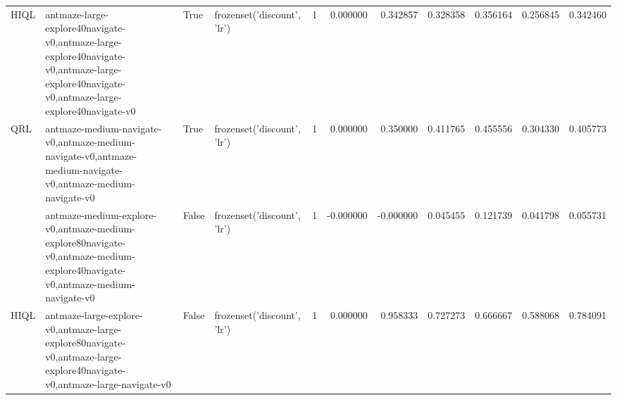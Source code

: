 \begin{tabular}{llllrrrrrrr}
\cline{1-11} \cline{2-11} \cline{3-11}
HIQL & antmaze-large-explore40navigate-v0,antmaze-large-explore40navigate-v0,antmaze-large-explore40navigate-v0,antmaze-large-explore40navigate-v0 & True & frozenset({'discount', 'lr'}) & 1 & 0.000000 & 0.342857 & 0.328358 & 0.356164 & 0.256845 & 0.342460 \\
\cline{1-11} \cline{2-11} \cline{3-11}
\multirow[t]{2}{*}{QRL} & antmaze-medium-navigate-v0,antmaze-medium-navigate-v0,antmaze-medium-navigate-v0,antmaze-medium-navigate-v0 & True & frozenset({'discount', 'lr'}) & 1 & 0.000000 & 0.350000 & 0.411765 & 0.455556 & 0.304330 & 0.405773 \\
\cline{2-11} \cline{3-11}
 & antmaze-medium-explore-v0,antmaze-medium-explore80navigate-v0,antmaze-medium-explore40navigate-v0,antmaze-medium-navigate-v0 & False & frozenset({'discount', 'lr'}) & 1 & -0.000000 & -0.000000 & 0.045455 & 0.121739 & 0.041798 & 0.055731 \\
\cline{1-11} \cline{2-11} \cline{3-11}
HIQL & antmaze-large-explore-v0,antmaze-large-explore80navigate-v0,antmaze-large-explore40navigate-v0,antmaze-large-navigate-v0 & False & frozenset({'discount', 'lr'}) & 1 & 0.000000 & 0.958333 & 0.727273 & 0.666667 & 0.588068 & 0.784091 \\
\cline{1-11} \cline{2-11} \cline{3-11}
\bottomrule
\end{tabular}
